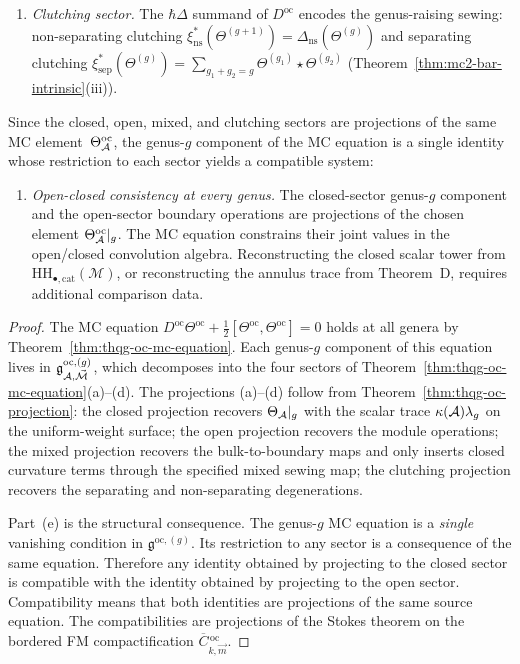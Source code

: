\begin{theorem}
\begin{enumerate}[label=\textup{(\alph*)}]
\item \emph{Clutching sector.}
 The $\hbar\Delta$ summand of $D^{\mathrm{oc}}$ encodes the
 genus-raising sewing: non-separating clutching
 $\xi_{\mathrm{ns}}^*(\Theta^{(g+1)})
 = \Delta_{\mathrm{ns}}(\Theta^{(g)})$
 and separating clutching
 $\xi_{\mathrm{sep}}^*(\Theta^{(g)})
 = \sum_{g_1+g_2=g}
 \Theta^{(g_1)} \star \Theta^{(g_2)}$
 \textup{(}Theorem~\textup{\ref{thm:mc2-bar-intrinsic}}(iii)\textup{)}.
\end{enumerate}
Since the closed, open, mixed, and clutching sectors are projections
of the same
MC element~$\Theta^{\mathrm{oc}}_{\mathcal{A}}$, the genus-$g$ component
of the MC equation is a single identity whose restriction to each
sector yields a compatible system:
\begin{enumerate}[resume, label=\textup{(\alph*)}]
\item \emph{Open-closed consistency at every genus.}
	 The closed-sector genus-$g$ component and the open-sector
	 boundary operations are projections of the chosen element
	 $\Theta^{\mathrm{oc}}_{\mathcal{A}}|_g$. The MC equation constrains their
	 joint values in the open/closed convolution algebra. Reconstructing
	 the closed scalar tower from
	 $\mathrm{HH}_{\bullet,\mathrm{cat}}(\mathcal M)$, or reconstructing
	 the annulus trace from Theorem~D, requires additional comparison
	 data.
\end{enumerate}
\end{theorem}

\begin{proof}
The MC equation
$D^{\mathrm{oc}}\Theta^{\mathrm{oc}} + \tfrac{1}{2}
[\Theta^{\mathrm{oc}}, \Theta^{\mathrm{oc}}] = 0$
holds at all genera by
Theorem~\ref{thm:thqg-oc-mc-equation}. Each genus-$g$
component of this equation lives in
$\mathfrak{g}^{\mathrm{oc},(g)}_{\mathcal{A}, \vec{\mathcal{M}}}$,
which decomposes into the four sectors of
Theorem~\ref{thm:thqg-oc-mc-equation}(a)--(d).
The projections (a)--(d) follow from
Theorem~\ref{thm:thqg-oc-projection}: the closed projection
recovers $\Theta_{\mathcal{A}}|_g$ with the scalar trace
$\kappa(\mathcal{A})\lambda_g$ on the uniform-weight surface;
the open projection recovers the module operations; the mixed
projection recovers the bulk-to-boundary maps and only inserts
closed curvature terms through the specified mixed sewing map;
the clutching projection recovers the separating and
non-separating degenerations.

Part~(e) is the structural consequence. The genus-$g$
MC equation is a \emph{single} vanishing condition in
$\mathfrak{g}^{\mathrm{oc},(g)}$. Its restriction to any
sector is a consequence of the same equation. Therefore
any identity obtained by projecting to the closed sector
is compatible with the identity obtained by projecting to the
open sector. Compatibility means that both identities are projections
of the same source equation. The
compatibilities are projections of the Stokes theorem on the
bordered FM compactification
$\overline{C}{}^{\,\mathrm{oc}}_{k, \vec{m}}$.
\end{proof}

